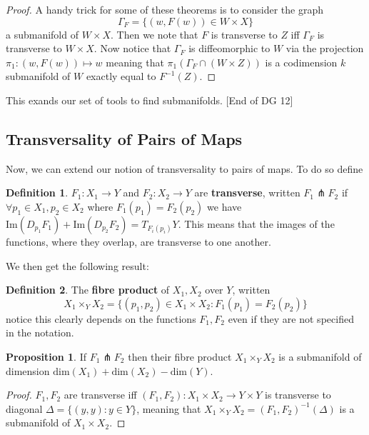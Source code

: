 \documentclass{article}
\theoremstyle{definition}
\newtheorem{definition}{Definition}
\newtheorem{proposition}{Proposition}
\begin{document}
\begin{proof}
A handy trick for some of these theorems is to consider the graph
$$ \Gamma_F = \{(w, F(w)) \in W \times X\}$$
a submanifold of $W \times X$. Then we note that $F$ is transverse to $Z$ iff
$\Gamma_F$ is transverse to $W \times X$. Now notice that $\Gamma_F$ is
diffeomorphic to $W$ via the projection $\pi_1 : (w, F(w)) \mapsto w$ meaning that
$\pi_1(\Gamma_F \cap (W \times Z))$ is a codimension $k$ submanifold of $W$
exactly equal to $F^{-1}(Z)$.
\end{proof}

This exands our set of tools to find submanifolds. [End of DG 12]

\subsection{Transversality of Pairs of Maps}

Now, we can extend our notion of transversality to pairs of maps. To do so
define

\begin{definition}
$F_1 : X_1 \to Y$ and $F_2 : X_2 \to Y$ are \textbf{transverse}, written $F_1
\pitchfork F_2$ if $\forall p_1 \in X_1, p_2 \in X_2$ where $F_1(p_1) =
F_2(p_2)$ we have $\text{Im}(D_{p_1} F_1) + \text{Im}(D_{p_2} F_2) =
T_{F_i(p_i)}Y$. This means that the images of the functions, where they overlap,
are transverse to one another.
\end{definition}

We then get the following result:

\begin{definition}
The \textbf{fibre product} of $X_1, X_2$ over $Y$, written
$$ X_1 \times_Y X_2 = \{(p_1, p_2) \in X_1 \times X_2 : F_1(p_1) = F_2(p_2)\} $$
notice this clearly depends on the functions $F_1, F_2$ even if they are not
specified in the notation.
\end{definition}

\begin{proposition}
If $F_1 \pitchfork F_2$ then their fibre product $X_1 \times_Y X_2$ is a
submanifold of dimension $\text{dim}(X_1) + \text{dim}(X_2) - \text{dim}(Y)$. 
\end{proposition}

\begin{proof}
$F_1, F_2$ are transverse iff $(F_1, F_2) : X_1 \times X_2 \to Y \times Y$ is
transverse to diagonal $\Delta = \{(y, y) : y \in Y\}$, meaning that $X_1
\times_Y X_2 = (F_1, F_2)^{-1}(\Delta)$ is a submanifold of $X_1 \times X_2$.
\end{proof}
\end{document}
